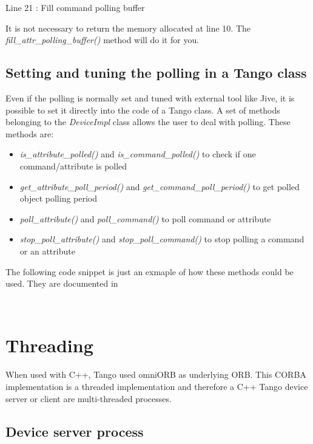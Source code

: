 Line 21 : Fill command polling buffer

It is not necessary to return the memory allocated at line 10. The
\emph{fill\_attr\_polling\_buffer()} method will do it for you.


\subsection{Setting and tuning the polling in a Tango class}

Even if the polling is normally set and tuned with external tool like
Jive, it is possible to set it directly into the code of a Tango class.
A set of methods belonging to the \emph{DeviceImpl} class allows the
user to deal with polling. These methods are:
\begin{itemize}
\item \emph{is\_attribute\_polled()} and \emph{is\_command\_polled()} to
check if one command/attribute is polled
\item \emph{get\_attribute\_poll\_period()} and \emph{get\_command\_poll\_period()}
to get polled object polling period
\item \emph{poll\_attribute()} and \emph{poll\_command()} to poll command
or attribute
\item \emph{stop\_poll\_attribute()} and \emph{stop\_poll\_command()} to
stop polling a command or an attribute
\end{itemize}
The following code snippet is just an exmaple of how these methods
could be used. They are documented in \cite{Tango-dsclasses-doc}


\begin{lyxcode}
~~~~~
\end{lyxcode}



\section{Threading\label{sec:Threading}}

When used with C++, Tango used omniORB as underlying ORB. This CORBA
implementation is a threaded implementation and therefore a C++ Tango
device server or client are multi-threaded processes.


\subsection{Device server process}

